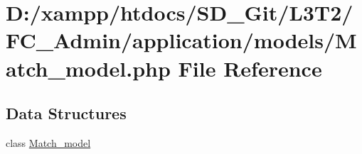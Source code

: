 \hypertarget{_match__model_8php}{}\section{D\+:/xampp/htdocs/\+S\+D\+\_\+\+Git/\+L3\+T2/\+F\+C\+\_\+\+Admin/application/models/\+Match\+\_\+model.php File Reference}
\label{_match__model_8php}
\subsection*{Data Structures}
\begin{DoxyCompactItemize}
\item 
class \hyperlink{class_match__model}{Match\+\_\+model}
\end{DoxyCompactItemize}

